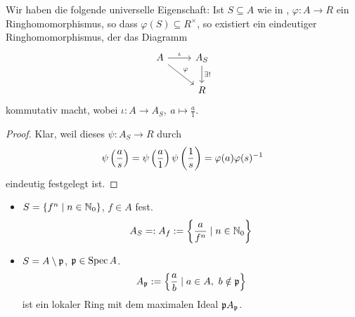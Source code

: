 \begin{lemma}
	\label{lemma:universelle eigenschaft lokalisierung}
	Wir haben die folgende universelle Eigenschaft: Ist
	$S\subseteq A$ wie in , $\varphi: A \to R$
	ein Ringhomomorphismus, so dass $\varphi(S) \subseteq R^\times$, so
	existiert ein eindeutiger Ringhomomorphismus, der das
	Diagramm
	\[\begin{tikzcd}
		A \rar{\iota} \arrow{dr}{\varphi} & A_S \dar{\exists!} \\
		& R
	\end{tikzcd}\]
	kommutativ macht, wobei
	$\iota: A \to A_S,\ a \mapsto \frac a 1$.
\end{lemma}
\begin{proof}
	Klar, weil dieses $\psi: A_S \to R$ durch
	\[
		\psi\left(\frac a s\right) = 
		\psi\left(\frac a 1\right) \psi\left(\frac 1 s\right) =
		\varphi(a) \varphi(s)^{-1}
	\]
	eindeutig festgelegt ist.
\end{proof}

\begin{beispiel}
	\begin{itemize}
	  \item $S = \{f^n \mid n \in \mathbb{N}_0\}$, $f \in A$ fest.
	  	\[ A_S =: A_f := \left\{ \frac{a}{f^n} \mid n\in \mathbb{N}_0\right\}\]
	  \item $S = A \setminus \mathfrak{p}$, $\mathfrak{p} \in \operatorname{Spec} A$.
	  	\[ A_\mathfrak{p} := \left\{ \frac a b \mid a \in A,\ b\notin \mathfrak{p} \right\}\]
	  	ist ein lokaler Ring mit dem maximalen Ideal $\mathfrak{p} A_\mathfrak{p}$.
	\end{itemize}
\end{beispiel}


